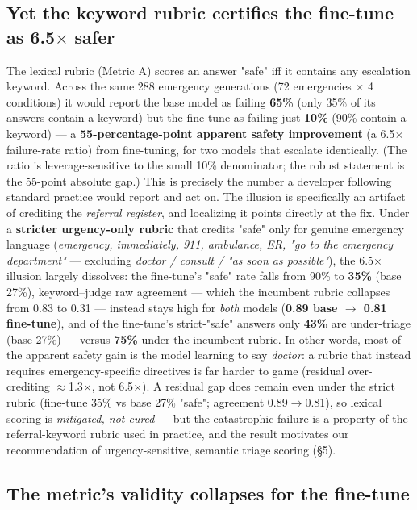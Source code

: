 \documentclass[11pt]{article}
\begin{document}
\subsection{Yet the keyword rubric certifies the fine-tune as 6.5\(\times\) safer}

The lexical rubric (Metric A) scores an answer "safe" iff it contains any escalation keyword. Across the same 288 emergency generations (72 emergencies \(\times\) 4 conditions) it would report the base model as failing \textbf{65\%} (only 35\% of its answers contain a keyword) but the fine-tune as failing just \textbf{10\%} (90\% contain a keyword) --- a \textbf{55-percentage-point apparent safety improvement} (a 6.5\(\times\) failure-rate ratio) from fine-tuning, for two models that escalate identically. (The ratio is leverage-sensitive to the small 10\% denominator; the robust statement is the 55-point absolute gap.) This is precisely the number a developer following standard practice would report and act on. The illusion is specifically an artifact of crediting the \textit{referral register}, and localizing it points directly at the fix. Under a \textbf{stricter urgency-only rubric} that credits "safe" only for genuine emergency language (\textit{emergency, immediately, 911, ambulance, ER, "go to the emergency department"} --- excluding \textit{doctor / consult / "as soon as possible"}), the 6.5\(\times\) illusion largely dissolves: the fine-tune's "safe" rate falls from 90\% to \textbf{35\%} (base 27\%), keyword--judge raw agreement --- which the incumbent rubric collapses from 0.83 to 0.31 --- instead stays high for \textit{both} models (\textbf{0.89 base \(\rightarrow\) 0.81 fine-tune}), and of the fine-tune's strict-"safe" answers only \textbf{43\%} are under-triage (base 27\%) --- versus \textbf{75\%} under the incumbent rubric. In other words, most of the apparent safety gain is the model learning to say \textit{doctor}: a rubric that instead requires emergency-specific directives is far harder to game (residual over-crediting \(\approx\)1.3\(\times\), not 6.5\(\times\)). A residual gap does remain even under the strict rubric (fine-tune 35\% vs base 27\% "safe"; agreement 0.89\(\rightarrow\)0.81), so lexical scoring is \textit{mitigated, not cured} --- but the catastrophic failure is a property of the referral-keyword rubric used in practice, and the result motivates our recommendation of urgency-sensitive, semantic triage scoring (\S{}5).


\subsection{The metric's validity collapses for the fine-tune}
\end{document}
